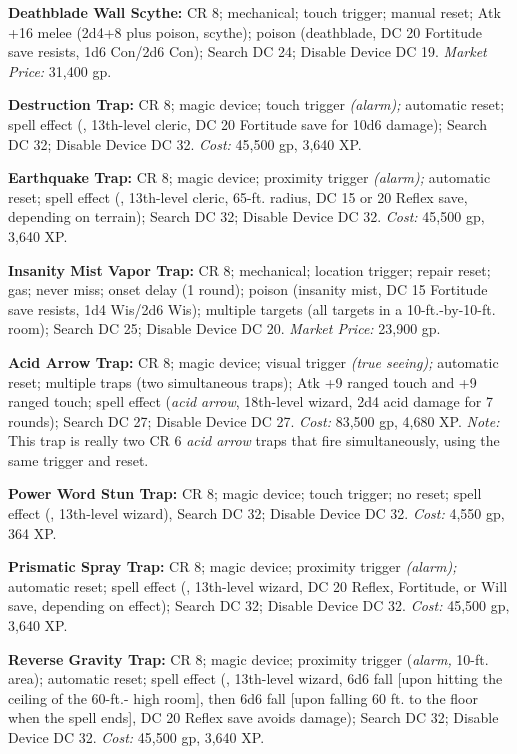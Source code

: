 \textbf{Deathblade Wall Scythe:} CR 8; mechanical; touch trigger; manual reset; 
Atk +16 melee (2d4+8 plus poison, scythe); poison (deathblade, DC 20 Fortitude 
save resists, 1d6 Con/2d6 Con); Search DC 24; Disable Device DC 19. \textit{Market 
Price:} 31,400 gp.

\textbf{Destruction Trap:} CR 8; magic device; touch trigger 
\textit{(alarm); }automatic reset; spell effect (, 13th-level 
cleric, DC 20 Fortitude save for 10d6 damage); Search DC 32; Disable Device DC 
32. \textit{Cost:} 45,500 gp, 3,640 XP.

\textbf{Earthquake Trap:} CR 8; magic device; proximity trigger 
\textit{(alarm); }automatic reset; spell effect (, 13th-level 
cleric, 65-ft. radius, DC 15 or 20 Reflex save, depending on terrain); Search DC 
32; Disable Device DC 32. \textit{Cost:} 45,500 gp, 3,640 XP.

\textbf{Insanity Mist Vapor Trap:} CR 8; mechanical; location trigger; repair reset; 
gas; never miss; onset delay (1 round); poison (insanity mist, DC 15 Fortitude 
save resists, 1d4 Wis/2d6 Wis); multiple targets (all targets in a 10-ft.-by-10-ft. 
room); Search DC 25; Disable Device DC 20. \textit{Market Price:} 23,900 gp.

\textbf{Acid Arrow Trap:} CR 8; magic device; visual trigger 
\textit{(true seeing); }automatic reset; multiple traps (two simultaneous 
traps); Atk +9 ranged touch and +9 ranged touch; spell effect (\textit{acid 
arrow}, 18th-level wizard, 2d4 acid damage for 7 rounds); Search DC 27; Disable 
Device DC 27. \textit{Cost:} 83,500 gp, 4,680 XP. \textit{Note:} This trap is really 
two CR 6 \textit{acid arrow} traps that fire simultaneously, using the same trigger 
and reset.

\textbf{Power Word Stun Trap:} CR 8; magic device; touch trigger; 
no reset; spell effect (, 13th-level wizard), Search DC 
32; Disable Device DC 32. \textit{Cost:} 4,550 gp, 364 XP.

\textbf{Prismatic Spray Trap:} CR 8; magic device; proximity 
trigger \textit{(alarm); }automatic reset; spell effect (, 
13th-level wizard, DC 20 Reflex, Fortitude, or Will save, depending on effect); 
Search DC 32; Disable Device DC 32. \textit{Cost:} 45,500 gp, 3,640 XP.

\textbf{Reverse Gravity Trap:} CR 8; magic device; proximity 
trigger (\textit{alarm, }10-ft. area); automatic reset; spell effect (,
13th-level wizard, 6d6 fall [upon hitting the ceiling of the 60-ft.- 
high room], then 6d6 fall [upon falling 60 ft. to the floor when the spell ends], 
DC 20 Reflex save avoids damage); Search DC 32; Disable Device DC 32. \textit{Cost: 
}45,500 gp, 3,640 XP.

